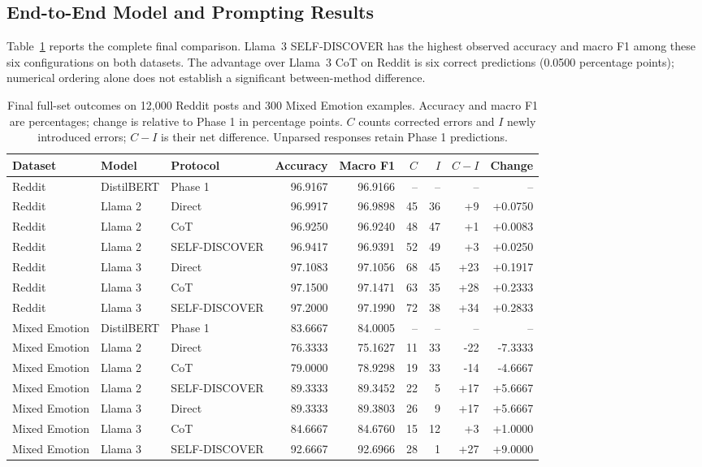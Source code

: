 \documentclass{ieeeaccess}
\begin{document}
\subsection{End-to-End Model and Prompting Results}
Table~\ref{tab:final-e2e} reports the complete final comparison. Llama~3 SELF-DISCOVER has the highest observed accuracy and macro F1 among these six configurations on both datasets. The advantage over Llama~3 CoT on Reddit is six correct predictions (0.0500 percentage points); numerical ordering alone does not establish a significant between-method difference.
\begin{table}[t]
\centering\small
\setlength{\tabcolsep}{4pt}\renewcommand{\arraystretch}{1.14}
\caption{Final full-set outcomes on 12,000 Reddit posts and 300 Mixed Emotion examples. Accuracy and macro F1 are percentages; change is relative to Phase 1 in percentage points. $C$ counts corrected errors and $I$ newly introduced errors; $C-I$ is their net difference. Unparsed responses retain Phase 1 predictions.}
\label{tab:final-e2e}
\begin{tabular*}{\textwidth}{@{\extracolsep{\fill}}lllrrrrrr@{}}
\toprule
Dataset & Model & Protocol & Accuracy & Macro F1 & $C$ & $I$ & $C-I$ & Change \\
\midrule
Reddit & DistilBERT & Phase 1 & 96.9167 & 96.9166 & -- & -- & -- & -- \\
Reddit & Llama 2 & Direct & 96.9917 & 96.9898 & 45 & 36 & +9 & +0.0750 \\
Reddit & Llama 2 & CoT & 96.9250 & 96.9240 & 48 & 47 & +1 & +0.0083 \\
Reddit & Llama 2 & SELF-DISCOVER & 96.9417 & 96.9391 & 52 & 49 & +3 & +0.0250 \\
Reddit & Llama 3 & Direct & 97.1083 & 97.1056 & 68 & 45 & +23 & +0.1917 \\
Reddit & Llama 3 & CoT & 97.1500 & 97.1471 & 63 & 35 & +28 & +0.2333 \\
Reddit & Llama 3 & SELF-DISCOVER & 97.2000 & 97.1990 & 72 & 38 & +34 & +0.2833 \\
Mixed Emotion & DistilBERT & Phase 1 & 83.6667 & 84.0005 & -- & -- & -- & -- \\
Mixed Emotion & Llama 2 & Direct & 76.3333 & 75.1627 & 11 & 33 & -22 & -7.3333 \\
Mixed Emotion & Llama 2 & CoT & 79.0000 & 78.9298 & 19 & 33 & -14 & -4.6667 \\
Mixed Emotion & Llama 2 & SELF-DISCOVER & 89.3333 & 89.3452 & 22 & 5 & +17 & +5.6667 \\
Mixed Emotion & Llama 3 & Direct & 89.3333 & 89.3803 & 26 & 9 & +17 & +5.6667 \\
Mixed Emotion & Llama 3 & CoT & 84.6667 & 84.6760 & 15 & 12 & +3 & +1.0000 \\
Mixed Emotion & Llama 3 & SELF-DISCOVER & 92.6667 & 92.6966 & 28 & 1 & +27 & +9.0000 \\
\bottomrule
\end{tabular*}
\end{table}
\end{document}
